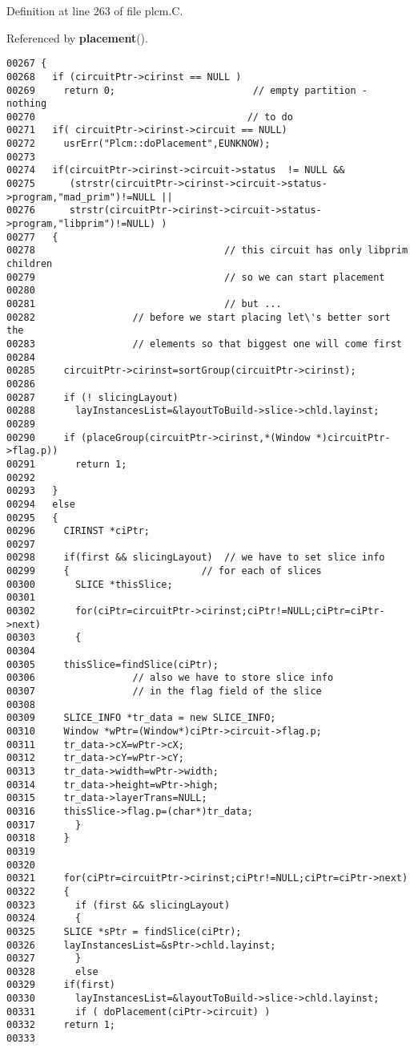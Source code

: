 Definition at line 263 of file plcm.C.

Referenced by {\bf placement}().\small\begin{verbatim}00267 {
00268   if (circuitPtr->cirinst == NULL )
00269     return 0;                        // empty partition - nothing
00270                                     // to do
00271   if( circuitPtr->cirinst->circuit == NULL)
00272     usrErr("Plcm::doPlacement",EUNKNOW);
00273 
00274   if(circuitPtr->cirinst->circuit->status  != NULL &&
00275      (strstr(circuitPtr->cirinst->circuit->status->program,"mad_prim")!=NULL ||
00276      strstr(circuitPtr->cirinst->circuit->status->program,"libprim")!=NULL) )
00277   {
00278                                 // this circuit has only libprim children
00279                                 // so we can start placement
00280 
00281                                 // but ...
00282                 // before we start placing let\'s better sort the
00283                 // elements so that biggest one will come first
00284 
00285     circuitPtr->cirinst=sortGroup(circuitPtr->cirinst);
00286 
00287     if (! slicingLayout)
00288       layInstancesList=&layoutToBuild->slice->chld.layinst;
00289       
00290     if (placeGroup(circuitPtr->cirinst,*(Window *)circuitPtr->flag.p))
00291       return 1;
00292 
00293   }
00294   else
00295   {
00296     CIRINST *ciPtr;
00297 
00298     if(first && slicingLayout)  // we have to set slice info
00299     {                       // for each of slices
00300       SLICE *thisSlice;
00301       
00302       for(ciPtr=circuitPtr->cirinst;ciPtr!=NULL;ciPtr=ciPtr->next)
00303       {
00304     
00305     thisSlice=findSlice(ciPtr);
00306                 // also we have to store slice info
00307                 // in the flag field of the slice
00308     
00309     SLICE_INFO *tr_data = new SLICE_INFO;
00310     Window *wPtr=(Window*)ciPtr->circuit->flag.p;
00311     tr_data->cX=wPtr->cX;
00312     tr_data->cY=wPtr->cY;
00313     tr_data->width=wPtr->width;
00314     tr_data->height=wPtr->high;
00315     tr_data->layerTrans=NULL;
00316     thisSlice->flag.p=(char*)tr_data;
00317       }
00318     }
00319 
00320 
00321     for(ciPtr=circuitPtr->cirinst;ciPtr!=NULL;ciPtr=ciPtr->next)
00322     {
00323       if (first && slicingLayout)
00324       {
00325     SLICE *sPtr = findSlice(ciPtr);
00326     layInstancesList=&sPtr->chld.layinst;
00327       }
00328       else
00329     if(first)
00330       layInstancesList=&layoutToBuild->slice->chld.layinst;
00331       if ( doPlacement(ciPtr->circuit) )
00332     return 1;
00333 

\end{verbatim}
